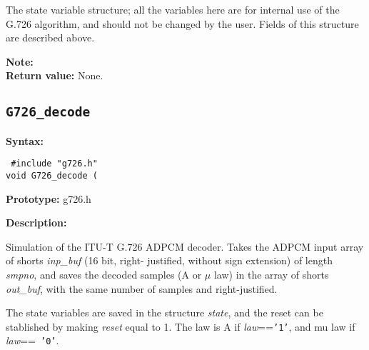 \begin{Descr}{\DescrLen}
\item[\pbox{20mm}{\em state}] %
               The state variable structure; all the variables here are for
               internal use of the G.726 algorithm, and should not be
               changed by the user. Fields of this structure are described
               above.
\end{Descr}

{\bf Note:} \hfill {}\\

{\bf Return value: }        None.


\subsection{{\tt G726\_decode}}

{\bf Syntax: }

{\tt
\#include "g726.h"\\
void G726\_decode
         (
}

{\bf Prototype: }    g726.h

{\bf Description: }

        Simulation of the ITU-T G.726 ADPCM decoder. Takes
        the ADPCM input array of shorts {\em inp\_buf} (16 bit, right-
        justified, without sign extension) of length {\em smpno}, and
        saves the decoded samples (A or $\mu$ law) in the array of
        shorts {\em out\_buf}, with the same number of samples and
        right-justified.

        The state variables are saved in the structure {\em state}, and the
        reset can be stablished by making {\em reset} equal to 1. The law
        is A if {\em law}=={\tt '1'}, and mu law if {\em law}=={\tt
        '0'}.

